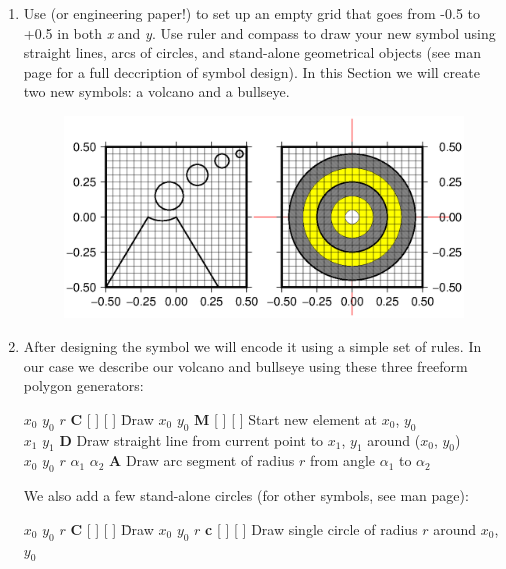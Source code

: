 \begin{enumerate}
\item Use  (or
engineering paper!) to set up an empty grid that goes from
-0.5 to +0.5 in both {\it x} and {\it y}.  Use ruler and
compass to draw your new symbol using straight lines,
arcs of circles, and stand-alone geometrical objects (see  man page for
a full deccription of symbol design).  In this Section we will create two new symbols:
a volcano and a bullseye.

\begin{figure}[ht]
   \centering\includegraphics{scripts/GMT_volcano}
\end{figure}

\item After designing the symbol we will encode it using a
simple set of rules.  In our case we describe our volcano and bullseye
using these three freeform polygon generators:

\begin{tabbing} 
$x_0$ $y_0$ $r$ {\bf C} [  ] [  ] \=Draw \kill
$x_0$ $y_0$ {\bf M} [  ] [  ] \> Start new element at $x_0$, $y_0$ \\ 
$x_1$ $y_1$ {\bf D} \> Draw straight line from current point to $x_1$, $y_1$ around ($x_0$, $y_0$) \\ 
$x_0$ $y_0$ $r$ $\alpha_1$ $\alpha_2$ {\bf A} \> Draw
arc segment of radius $r$ from angle $\alpha_1$ to $\alpha_2$
\end{tabbing} 

We also add a few stand-alone circles (for other symbols, see  man page):

\begin{tabbing} 
$x_0$ $y_0$ $r$ {\bf C} [  ] [  ] \=Draw \kill
$x_0$ $y_0$ $r$ {\bf c} [  ] [  ] \> Draw
single circle of radius $r$ around $x_0$, $y_0$ \\
\end{tabbing} 


\end{enumerate}
